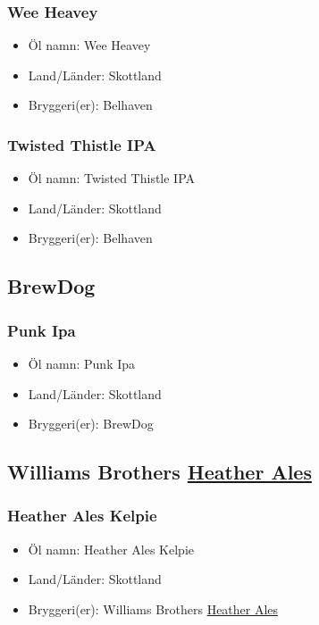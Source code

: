 \documentclass[11pt]{article}
\begin{document}
\subsubsection{Wee Heavey}
\label{sec:orgb4b7362}
\begin{itemize}
\item Öl namn: Wee Heavey
\item Land/Länder: Skottland
\item Bryggeri(er): Belhaven
\end{itemize}
\subsubsection{Twisted Thistle IPA}
\label{sec:orgd425896}
\begin{itemize}
\item Öl namn: Twisted Thistle IPA
\item Land/Länder: Skottland
\item Bryggeri(er): Belhaven
\end{itemize}
\subsection{BrewDog}
\label{sec:org5168d9a}
\subsubsection{Punk Ipa}
\label{sec:org1b47e05}
\begin{itemize}
\item Öl namn: Punk Ipa
\item Land/Länder: Skottland
\item Bryggeri(er): BrewDog
\end{itemize}
\subsection{Williams Brothers \underline{Heather Ales}}
\label{sec:org7371238}
\subsubsection{Heather Ales Kelpie}
\label{sec:orgf763bf3}
\begin{itemize}
\item Öl namn: Heather Ales Kelpie
\item Land/Länder: Skottland
\item Bryggeri(er): Williams Brothers \uline{Heather Ales}
\end{itemize}
\end{document}
